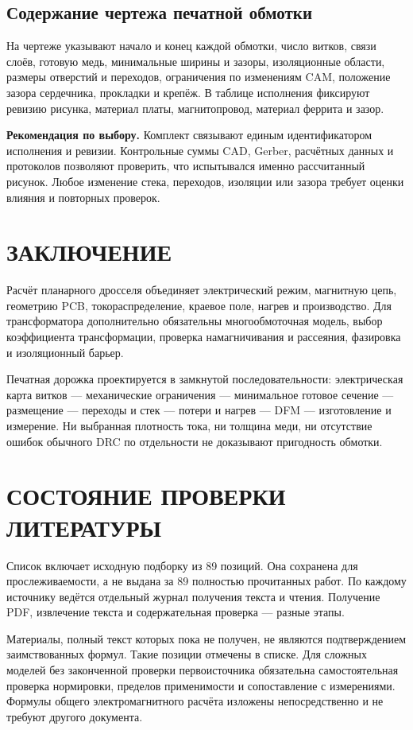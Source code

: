 \documentclass[14pt,a4paper]{extarticle}
\newcommand{\recommend}{\par\noindent\textbf{Рекомендация по выбору.} }
\begin{document}
\subsection{Содержание чертежа печатной обмотки}
На чертеже указывают начало и конец каждой обмотки, число витков, связи слоёв, готовую медь, минимальные ширины и зазоры, изоляционные области, размеры отверстий и переходов, ограничения по изменениям CAM, положение зазора сердечника, прокладки и крепёж. В таблице исполнения фиксируют ревизию рисунка, материал платы, магнитопровод, материал феррита и зазор.

\recommend Комплект связывают единым идентификатором исполнения и ревизии. Контрольные суммы CAD, Gerber, расчётных данных и протоколов позволяют проверить, что испытывался именно рассчитанный рисунок. Любое изменение стека, переходов, изоляции или зазора требует оценки влияния и повторных проверок.

\section{ЗАКЛЮЧЕНИЕ}
Расчёт планарного дросселя объединяет электрический режим, магнитную цепь, геометрию PCB, токораспределение, краевое поле, нагрев и производство. Для трансформатора дополнительно обязательны многообмоточная модель, выбор коэффициента трансформации, проверка намагничивания и рассеяния, фазировка и изоляционный барьер.

Печатная дорожка проектируется в замкнутой последовательности: электрическая карта витков --- механические ограничения --- минимальное готовое сечение --- размещение --- переходы и стек --- потери и нагрев --- DFM --- изготовление и измерение. Ни выбранная плотность тока, ни толщина меди, ни отсутствие ошибок обычного DRC по отдельности не доказывают пригодность обмотки.

\appendix
\section{СОСТОЯНИЕ ПРОВЕРКИ ЛИТЕРАТУРЫ}
Список включает исходную подборку из 89 позиций. Она сохранена для прослеживаемости, а не выдана за 89 полностью прочитанных работ. По каждому источнику ведётся отдельный журнал получения текста и чтения. Получение PDF, извлечение текста и содержательная проверка --- разные этапы.

Материалы, полный текст которых пока не получен, не являются подтверждением заимствованных формул. Такие позиции отмечены в списке. Для сложных моделей без законченной проверки первоисточника обязательна самостоятельная проверка нормировки, пределов применимости и сопоставление с измерениями. Формулы общего электромагнитного расчёта изложены непосредственно и не требуют другого документа.
\end{document}
